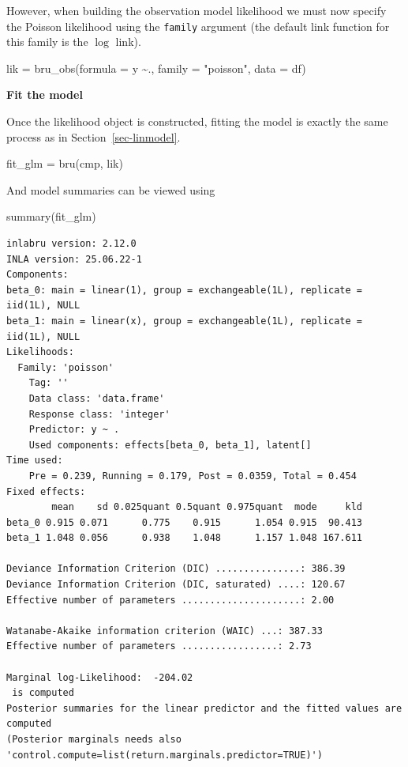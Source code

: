 \documentclass[
  letterpaper,
  DIV=11,
  numbers=noendperiod]{scrartcl}
\newenvironment{Shaded}{\begin{snugshade}}{\end{snugshade}}
\newcommand{\AttributeTok}[1]{\textcolor[rgb]{0.40,0.45,0.13}{#1}}
\newcommand{\FunctionTok}[1]{\textcolor[rgb]{0.28,0.35,0.67}{#1}}
\newcommand{\NormalTok}[1]{\textcolor[rgb]{0.00,0.23,0.31}{#1}}
\newcommand{\OtherTok}[1]{\textcolor[rgb]{0.00,0.23,0.31}{#1}}
\newcommand{\SpecialCharTok}[1]{\textcolor[rgb]{0.37,0.37,0.37}{#1}}
\newcommand{\StringTok}[1]{\textcolor[rgb]{0.13,0.47,0.30}{#1}}
\begin{document}
However, when building the observation model likelihood we must now
specify the Poisson likelihood using the \texttt{family} argument (the
default link function for this family is the \(\log\) link).

\begin{Shaded}
\begin{Highlighting}[]
\NormalTok{lik }\OtherTok{=}  \FunctionTok{bru\_obs}\NormalTok{(}\AttributeTok{formula =}\NormalTok{ y }\SpecialCharTok{\textasciitilde{}}\NormalTok{.,}
            \AttributeTok{family =} \StringTok{"poisson"}\NormalTok{,}
            \AttributeTok{data =}\NormalTok{ df)}
\end{Highlighting}
\end{Shaded}

\textbf{Fit the model}

Once the likelihood object is constructed, fitting the model is exactly
the same process as in Section~\ref{sec-linmodel}.

\begin{Shaded}
\begin{Highlighting}[]
\NormalTok{fit\_glm }\OtherTok{=} \FunctionTok{bru}\NormalTok{(cmp, lik)}
\end{Highlighting}
\end{Shaded}

And model summaries can be viewed using

\begin{Shaded}
\begin{Highlighting}[]
\FunctionTok{summary}\NormalTok{(fit\_glm)}
\end{Highlighting}
\end{Shaded}

\begin{verbatim}
inlabru version: 2.12.0
INLA version: 25.06.22-1
Components:
beta_0: main = linear(1), group = exchangeable(1L), replicate = iid(1L), NULL
beta_1: main = linear(x), group = exchangeable(1L), replicate = iid(1L), NULL
Likelihoods:
  Family: 'poisson'
    Tag: ''
    Data class: 'data.frame'
    Response class: 'integer'
    Predictor: y ~ .
    Used components: effects[beta_0, beta_1], latent[]
Time used:
    Pre = 0.239, Running = 0.179, Post = 0.0359, Total = 0.454 
Fixed effects:
        mean    sd 0.025quant 0.5quant 0.975quant  mode     kld
beta_0 0.915 0.071      0.775    0.915      1.054 0.915  90.413
beta_1 1.048 0.056      0.938    1.048      1.157 1.048 167.611

Deviance Information Criterion (DIC) ...............: 386.39
Deviance Information Criterion (DIC, saturated) ....: 120.67
Effective number of parameters .....................: 2.00

Watanabe-Akaike information criterion (WAIC) ...: 387.33
Effective number of parameters .................: 2.73

Marginal log-Likelihood:  -204.02 
 is computed 
Posterior summaries for the linear predictor and the fitted values are computed
(Posterior marginals needs also 'control.compute=list(return.marginals.predictor=TRUE)')
\end{verbatim}
\end{document}
